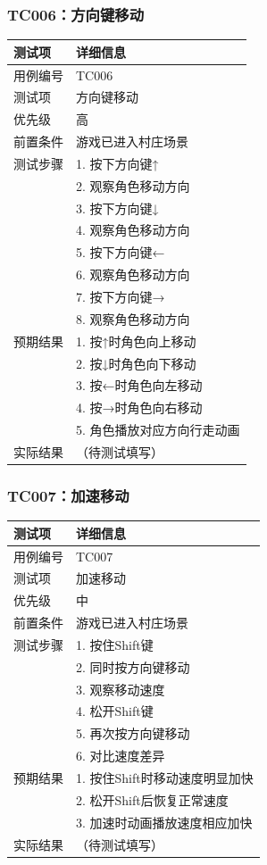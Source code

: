 \documentclass[a4paper,12pt]{article}
\begin{document}
\subsubsection{TC006：方向键移动}
\begin{table}[h]
\centering
\begin{tabular}{ll}
\toprule
测试项 & 详细信息 \\
\midrule
用例编号 & TC006 \\
测试项 & 方向键移动 \\
优先级 & 高 \\
前置条件 & 游戏已进入村庄场景 \\
测试步骤 & 1. 按下方向键↑ \\
 & 2. 观察角色移动方向 \\
 & 3. 按下方向键↓ \\
 & 4. 观察角色移动方向 \\
 & 5. 按下方向键← \\
 & 6. 观察角色移动方向 \\
 & 7. 按下方向键→ \\
 & 8. 观察角色移动方向 \\
预期结果 & 1. 按↑时角色向上移动 \\
 & 2. 按↓时角色向下移动 \\
 & 3. 按←时角色向左移动 \\
 & 4. 按→时角色向右移动 \\
 & 5. 角色播放对应方向行走动画 \\
实际结果 & （待测试填写） \\
\bottomrule
\end{tabular}
\end{table}

\subsubsection{TC007：加速移动}
\begin{table}[h]
\centering
\begin{tabular}{ll}
\toprule
测试项 & 详细信息 \\
\midrule
用例编号 & TC007 \\
测试项 & 加速移动 \\
优先级 & 中 \\
前置条件 & 游戏已进入村庄场景 \\
测试步骤 & 1. 按住Shift键 \\
 & 2. 同时按方向键移动 \\
 & 3. 观察移动速度 \\
 & 4. 松开Shift键 \\
 & 5. 再次按方向键移动 \\
 & 6. 对比速度差异 \\
预期结果 & 1. 按住Shift时移动速度明显加快 \\
 & 2. 松开Shift后恢复正常速度 \\
 & 3. 加速时动画播放速度相应加快 \\
实际结果 & （待测试填写） \\
\bottomrule
\end{tabular}
\end{table}
\end{document}

